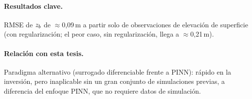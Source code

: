 \paragraph{Resultados clave.}
RMSE de $z_b$ de $\approx$0,09\,m a partir solo de observaciones de elevación de
superficie (con regularización; el peor caso, sin regularización, llega a
$\approx$0,21\,m).

\paragraph{Relación con esta tesis.}
Paradigma alternativo (surrogado diferenciable frente a PINN): rápido en la
inversión, pero inaplicable sin un gran conjunto de simulaciones previas, a
diferencia del enfoque PINN, que no requiere datos de simulación.
